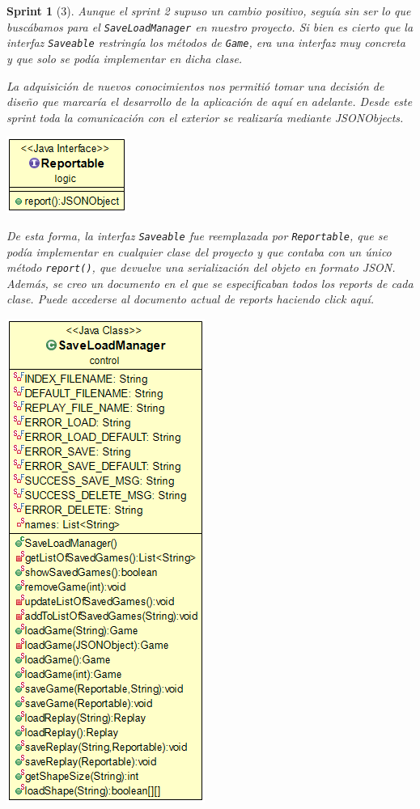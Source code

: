 \documentclass[12pt,a4paper,openright]{book}
\theoremstyle{break}
\newtheorem*{sprint}{Sprint}
\begin{document}
\begin{sprint}[3]
Aunque el sprint 2 supuso un cambio positivo, seguía sin ser lo que buscábamos para el \texttt{SaveLoadManager} en nuestro proyecto. Si bien es cierto que la interfaz \texttt{Saveable} restringía los métodos de \texttt{Game}, era una interfaz muy concreta y que solo se podía implementar en dicha clase.

La adquisición de nuevos conocimientos nos permitió tomar una decisión de diseño que marcaría el desarrollo de la aplicación de aquí en adelante. Desde este sprint toda la comunicación con el exterior se realizaría mediante JSONObjects.

\begin{center}
\centering
\includegraphics[scale=0.5]{reportable.png}
\end{center}

De esta forma, la interfaz \texttt{Saveable} fue reemplazada por \texttt{Reportable}, que se podía implementar en cualquier clase del proyecto y que contaba con un único método \texttt{report()}, que devuelve una serialización del objeto en formato JSON. Además, se creo un documento en el que se especificaban todos los reports de cada clase. Puede accederse al documento actual de reports haciendo click aquí. %


\begin{center}
\centering
\includegraphics[scale=0.5]{save-load-manager-sprint3.png}
\end{center}


\end{sprint}
\end{document}
